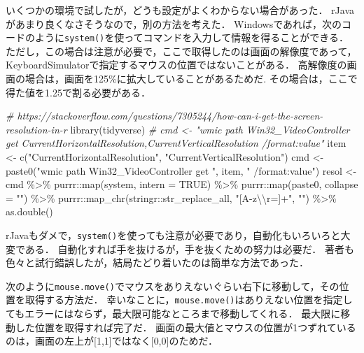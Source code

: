 \documentclass[
]{article}
\newenvironment{Shaded}{\begin{snugshade}}{\end{snugshade}}
\newcommand{\AttributeTok}[1]{\textcolor[rgb]{0.77,0.63,0.00}{#1}}
\newcommand{\CommentTok}[1]{\textcolor[rgb]{0.56,0.35,0.01}{\textit{#1}}}
\newcommand{\ConstantTok}[1]{\textcolor[rgb]{0.00,0.00,0.00}{#1}}
\newcommand{\FunctionTok}[1]{\textcolor[rgb]{0.00,0.00,0.00}{#1}}
\newcommand{\NormalTok}[1]{#1}
\newcommand{\OtherTok}[1]{\textcolor[rgb]{0.56,0.35,0.01}{#1}}
\newcommand{\SpecialCharTok}[1]{\textcolor[rgb]{0.00,0.00,0.00}{#1}}
\newcommand{\StringTok}[1]{\textcolor[rgb]{0.31,0.60,0.02}{#1}}
\begin{document}
いくつかの環境で試したが，どうも設定がよくわからない場合があった．
rJavaがあまり良くなさそうなので，別の方法を考えた．
Windowsであれば，次のコードのように\texttt{system()}を使ってコマンドを入力して情報を得ることができる．
ただし，この場合は注意が必要で，ここで取得したのは画面の解像度であって，KeyboardSimulatorで指定するマウスの位置ではないことがある．
高解像度の画面の場合は，画面を125\%に拡大していることがあるためだ.
その場合は，ここで得た値を1.25で割る必要がある．

\begin{Shaded}
\begin{Highlighting}[]
  \CommentTok{\#   https://stackoverflow.com/questions/7305244/how{-}can{-}i{-}get{-}the{-}screen{-}resolution{-}in{-}r}
\FunctionTok{library}\NormalTok{(tidyverse)}
  \CommentTok{\# cmd \textless{}{-} "wmic path Win32\_VideoController get CurrentHorizontalResolution,CurrentVerticalResolution /format:value"}
\NormalTok{item }\OtherTok{\textless{}{-}} \FunctionTok{c}\NormalTok{(}\StringTok{"CurrentHorizontalResolution"}\NormalTok{, }\StringTok{"CurrentVerticalResolution"}\NormalTok{)}
\NormalTok{cmd }\OtherTok{\textless{}{-}} \FunctionTok{paste0}\NormalTok{(}\StringTok{"wmic path Win32\_VideoController get "}\NormalTok{, item, }\StringTok{" /format:value"}\NormalTok{)}
\NormalTok{resol }\OtherTok{\textless{}{-}} 
\NormalTok{  cmd }\SpecialCharTok{\%\textgreater{}\%}
\NormalTok{  purrr}\SpecialCharTok{::}\FunctionTok{map}\NormalTok{(system, }\AttributeTok{intern =} \ConstantTok{TRUE}\NormalTok{) }\SpecialCharTok{\%\textgreater{}\%}
\NormalTok{  purrr}\SpecialCharTok{::}\FunctionTok{map}\NormalTok{(paste0, }\AttributeTok{collapse =} \StringTok{""}\NormalTok{) }\SpecialCharTok{\%\textgreater{}\%}
\NormalTok{  purrr}\SpecialCharTok{::}\FunctionTok{map\_chr}\NormalTok{(stringr}\SpecialCharTok{::}\NormalTok{str\_replace\_all, }\StringTok{"[A{-}z}\SpecialCharTok{\textbackslash{}\textbackslash{}}\StringTok{r=]+"}\NormalTok{, }\StringTok{""}\NormalTok{) }\SpecialCharTok{\%\textgreater{}\%}
  \FunctionTok{as.double}\NormalTok{()}
\end{Highlighting}
\end{Shaded}

rJavaもダメで，\texttt{system()}を使っても注意が必要であり，自動化もいろいろと大変である．
自動化すれば手を抜けるが，手を抜くための努力は必要だ．
著者も色々と試行錯誤したが，結局たどり着いたのは簡単な方法であった．

次のように\texttt{mouse.move()}でマウスをありえないぐらい右下に移動して，その位置を取得する方法だ．
幸いなことに，\texttt{mouse.move()}はありえない位置を指定してもエラーにはならず，最大限可能なところまで移動してくれる．
最大限に移動した位置を取得すれば完了だ．
画面の最大値とマウスの位置が1つずれているのは，画面の左上が{[}1,1{]}ではなく{[}0,0{]}のためだ．
\end{document}

